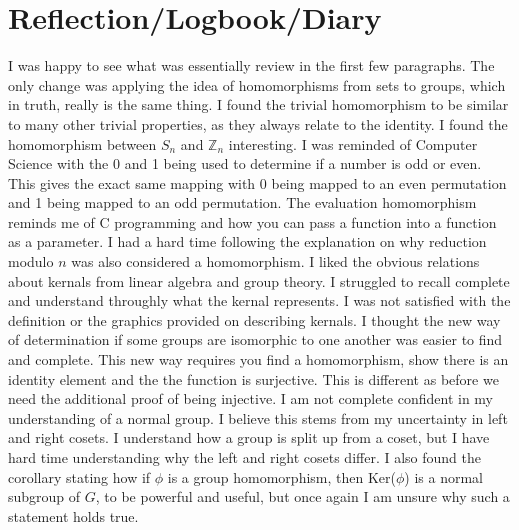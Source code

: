 \documentclass[11pt]{article}
\theoremstyle{plain}
\theoremstyle{definition}
\newcommand{\Z}{\mathbb{Z}}
\begin{document}
\section{Reflection/Logbook/Diary}
I was happy to see what was essentially review in the first few paragraphs. The only change was applying the idea of homomorphisms from sets to groups, which in truth, really is the same thing. I found the trivial homomorphism to be similar to many other trivial properties, as they always relate to the identity.
I found the homomorphism between $ S_n $ and $ \Z_n $ interesting. I was reminded of Computer Science with the 0 and 1 being used to determine if a number is odd or even. This gives the exact same mapping with 0 being mapped to an even permutation and 1 being mapped to an odd permutation. The evaluation homomorphism reminds me of C programming and how you can pass a function into a function as a parameter. I had a hard time following the explanation on why reduction modulo $ n $ was also considered a homomorphism. 
I liked the obvious relations about kernals from linear algebra and group theory. I struggled to recall complete and understand throughly what the kernal represents. I was not satisfied with the definition or the graphics provided on describing kernals. I thought the new way of determination if some groups are isomorphic to one another was easier to find and complete. This new way requires you find a homomorphism, show there is an identity element and the the function is surjective. This is different as before we need the additional proof of being injective. I am not complete confident in my understanding of a normal group. I believe this stems from my uncertainty in left and right cosets. I understand how a group is split up from a coset, but I have hard time understanding why the left and right cosets differ. I also found the corollary stating how if $ \phi $ is a group homomorphism, then Ker($\phi$) is a normal subgroup of $ G $, to be powerful and useful, but once again I am unsure why such a statement holds true.
\end{document}
